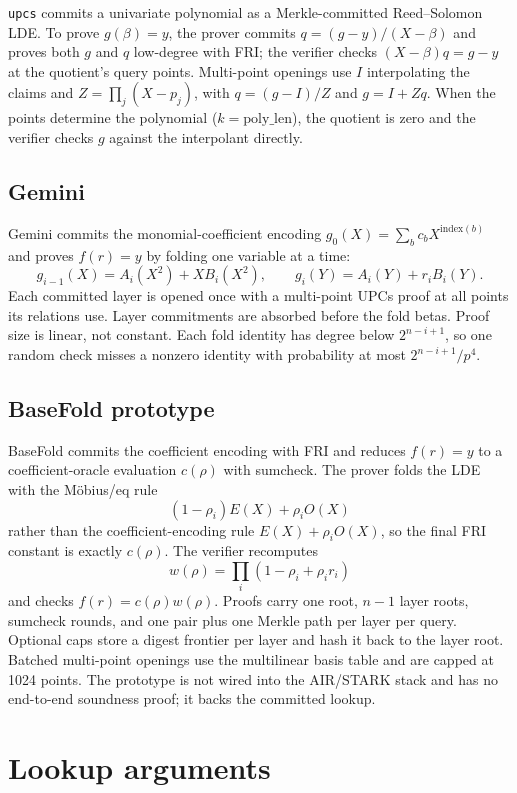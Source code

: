 \documentclass[11pt,a4paper]{article}
\begin{document}
\texttt{upcs} commits a univariate polynomial as a Merkle-committed
Reed--Solomon LDE. To prove $g(\beta)=y$, the prover commits
$q=(g-y)/(X-\beta)$ and proves both $g$ and $q$ low-degree with FRI; the
verifier checks $(X-\beta)q=g-y$ at the quotient's query points. Multi-point
openings use $I$ interpolating the claims and $Z=\prod_j(X-p_j)$, with
$q=(g-I)/Z$ and $g=I+Zq$. When the points determine the polynomial
($k=\mathrm{poly\_len}$), the quotient is zero and the verifier checks $g$
against the interpolant directly.

\subsection{Gemini}

Gemini commits the monomial-coefficient encoding
$g_0(X)=\sum_b c_bX^{\mathrm{index}(b)}$ and proves $f(r)=y$ by folding one
variable at a time:
\[
g_{i-1}(X)=A_i(X^2)+XB_i(X^2),\qquad
g_i(Y)=A_i(Y)+r_iB_i(Y).
\]
Each committed layer is opened once with a multi-point UPCs proof at all
points its relations use. Layer commitments are absorbed before the fold
betas. Proof size is linear, not constant. Each fold identity has degree
below $2^{n-i+1}$, so one random check misses a nonzero identity with
probability at most $2^{n-i+1}/p^4$.

\subsection{BaseFold prototype}

BaseFold commits the coefficient encoding with FRI and reduces $f(r)=y$ to a
coefficient-oracle evaluation $c(\rho)$ with sumcheck. The prover folds the
LDE with the Möbius/eq rule
\[
(1-\rho_i)E(X)+\rho_iO(X)
\]
rather than the coefficient-encoding rule $E(X)+\rho_iO(X)$, so the final
FRI constant is exactly $c(\rho)$. The verifier recomputes
\[
w(\rho)=\prod_i(1-\rho_i+\rho_i r_i)
\]
and checks $f(r)=c(\rho)w(\rho)$. Proofs carry one root, $n-1$ layer roots,
sumcheck rounds, and one pair plus one Merkle path per layer per query.
Optional caps store a digest frontier per layer and hash it back to the layer
root. Batched multi-point openings use the multilinear basis table and are
capped at 1024 points. The prototype is not wired into the AIR/STARK stack
and has no end-to-end soundness proof; it backs the committed lookup.

\section{Lookup arguments}
\end{document}
